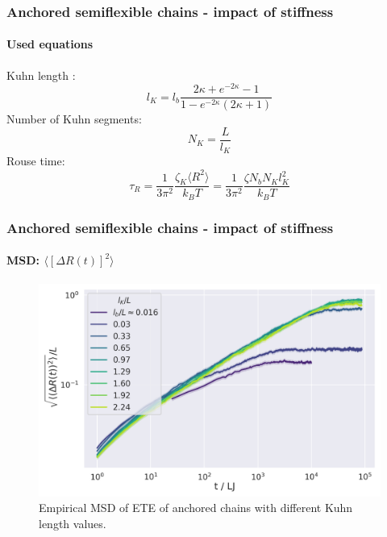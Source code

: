 \documentclass[handout]{beamer}
\newcommand{\mean}[1]{\langle #1 \rangle}
\begin{document}
\begin{frame}
    \frametitle{Anchored semiflexible chains - impact of stiffness}
    \framesubtitle{Used equations}

    Kuhn length \cite{svaneborg_2020}:
    \begin{equation}
        l_K = l_b \frac{2\kappa + e^{-2 \kappa} - 1}{1-e^{-2\kappa}(2 \kappa + 1)}
    \end{equation}
    Number of Kuhn segments:
    \begin{equation} 
        N_K = \frac{L}{l_K}
    \end{equation}
    Rouse time:
    \begin{equation} \label{eq:tau_R_kuhn}
        \tau_R = \frac{1}{3 \pi^2} \frac{\zeta_{K} \mean{R^2}}{k_B T} = \frac{1}{3 \pi^2} \frac{\zeta N_b N_K l_K^2}{k_B T}
    \end{equation}
\end{frame}


\begin{frame}
    \frametitle{Anchored semiflexible chains - impact of stiffness}
    \framesubtitle{MSD: $\mean{[\Delta R(t)]^2}$}

    \begin{figure}
        \centering
        \includegraphics[width=\columnwidth,trim={0cm 0cm 0cm 0.0cm},clip]{4-exp-delta_R-bare-log.png}
        \caption{Empirical MSD of ETE of anchored chains with different Kuhn length values.}
        \label{fig:msd_anchored_l_K}
    \end{figure}
\end{frame}
\end{document}
